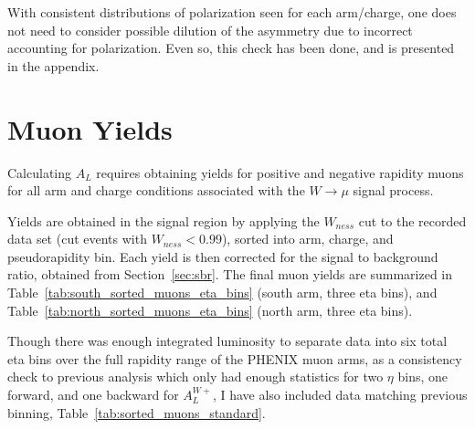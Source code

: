 With consistent distributions of polarization seen for each arm/charge, one does
not need to consider possible dilution of the asymmetry due to incorrect
accounting for polarization. Even so, this check has been done, and is presented
in the appendix. 

\clearpage
\section{Muon Yields}

Calculating $A_L$ requires obtaining yields for positive and negative rapidity
muons for all arm and charge conditions associated with the $W\rightarrow\mu$
signal process. 

Yields are obtained in the signal region by applying the $W_{ness}$ cut to the
recorded data set (cut events with $W_{ness} < 0.99 $), sorted into arm, charge,
and pseudorapidity bin. Each yield is then corrected for the signal to
background ratio, obtained from Section~\ref{sec:sbr}. The final muon yields are
summarized in Table~\ref{tab:south_sorted_muons_eta_bins} (south arm, three eta
bins), and Table~\ref{tab:north_sorted_muons_eta_bins} (north arm, three eta
bins).

Though there was enough integrated luminosity to separate data into six total
eta bins over the full rapidity range of the PHENIX muon arms, as a consistency
check to previous analysis which only had enough statistics for two $\eta$ bins,
one forward, and one backward for $A_L^{W+}$, I have also included data matching
previous binning, Table~\ref{tab:sorted_muons_standard}.

